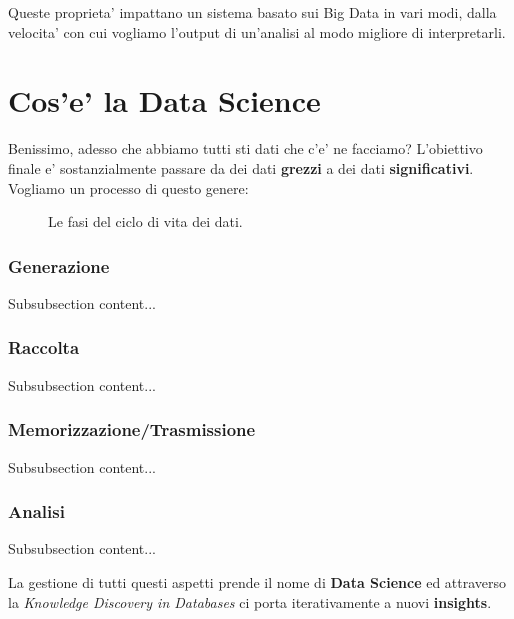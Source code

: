 Queste proprieta' impattano un sistema basato sui Big Data in vari modi, dalla velocita' con cui vogliamo l'output di un'analisi al modo migliore di interpretarli.

\section{Cos'e' la Data Science}
Benissimo, adesso che abbiamo tutti sti dati che c'e' ne facciamo? L'obiettivo finale e' sostanzialmente passare da dei dati \textbf{grezzi} a dei dati \textbf{significativi}. Vogliamo un processo di questo genere:

\begin{figure}[htbp]
    \centering
    \caption{Le fasi del ciclo di vita dei dati.}
    \label{fig:ciclo_vita_dati}
\end{figure}

\subsubsection{Generazione}
Subsubsection content...

\subsubsection{Raccolta}
Subsubsection content...

\subsubsection{Memorizzazione/Trasmissione}
Subsubsection content...

\subsubsection{Analisi}
Subsubsection content...

La gestione di tutti questi aspetti prende il nome di \textbf{Data Science} ed attraverso la \textit{Knowledge Discovery in Databases} ci porta iterativamente a nuovi \textbf{insights}.
